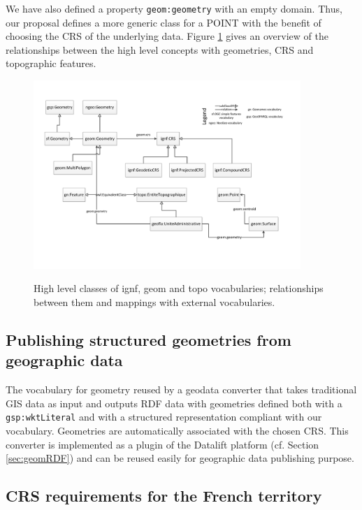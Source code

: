 We have also defined a property \texttt{geom:geometry} with an empty domain. Thus, our proposal defines a more generic class for a \textsf{POINT} with the benefit of choosing the CRS of the underlying data. Figure \ref{fig:geomcrs} gives an overview of the relationships between the high level concepts with geometries, CRS and topographic features.

\begin{figure}[!htbp]
\vspace{-13pt}
  \begin{center}
  \includegraphics[width=0.9\textwidth]{img/vocabs-ign.pdf}
  \vspace{-15pt}
  \caption{High level classes of ignf, geom and topo vocabularies; relationships between them and mappings with external vocabularies.}
  \vspace{-10pt}
  \label{fig:geomcrs}
  \end{center}
\end{figure}


\subsection{Publishing structured geometries from geographic data}
The vocabulary for geometry reused by a geodata converter that takes traditional GIS data as input and outputs RDF data with geometries defined both with a \texttt{gsp:wktLiteral} and with a structured representation compliant with our vocabulary. Geometries are automatically associated with the chosen CRS. This converter is implemented as a plugin of the Datalift platform (cf. Section \ref{sec:geomRDF}) and can be reused easily for geographic data publishing purpose.


\subsection{CRS requirements for the  French territory} \label{sec:reqs}

